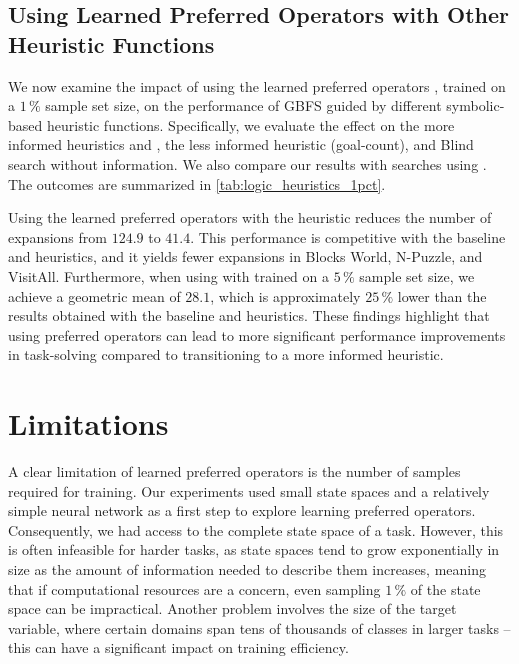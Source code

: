 \documentclass[ppgc,diss,english]{iiufrgs}
\begin{document}



\section{Using Learned Preferred Operators with Other Heuristic Functions}
\label{sec:other-heuristic-functions}
We now examine the impact of using the learned preferred operators \pog, trained on a $1\,\%$ sample set size, on the performance of GBFS guided by different symbolic-based heuristic functions. Specifically, we evaluate the effect on the more informed heuristics \hff and \hadd, the less informed heuristic \hgc (goal-count), and Blind search without information. We also compare our results with searches using \poff. The outcomes are summarized in \cref{tab:logic_heuristics_1pct}.



Using the learned preferred operators \pog with the \hgc heuristic reduces the number of expansions from $124.9$ to $41.4$. This performance is competitive with the baseline \hff and \hadd heuristics, and it yields fewer expansions in Blocks World, N-Puzzle, and VisitAll. Furthermore, when using \hgc with \pog trained on a $5\,\%$ sample set size, we achieve a geometric mean of $28.1$, which is approximately $25\,\%$ lower than the results obtained with the baseline \hff and \hadd heuristics. These findings highlight that using preferred operators can lead to more significant performance improvements in task-solving compared to transitioning to a more informed heuristic.


\chapter{Limitations}
\label{cha:limitations}
A clear limitation of learned preferred operators is the number of samples required for training. Our experiments used small state spaces and a relatively simple neural network as a first step to explore learning preferred operators. Consequently, we had access to the complete state space of a task. However, this is often infeasible for harder tasks, as state spaces tend to grow exponentially in size as the amount of information needed to describe them increases, meaning that if computational resources are a concern, even sampling $1\,\%$ of the state space can be impractical. Another problem involves the size of the target variable, where certain domains span tens of thousands of classes in larger tasks -- this can have a significant impact on training efficiency.
\end{document}

